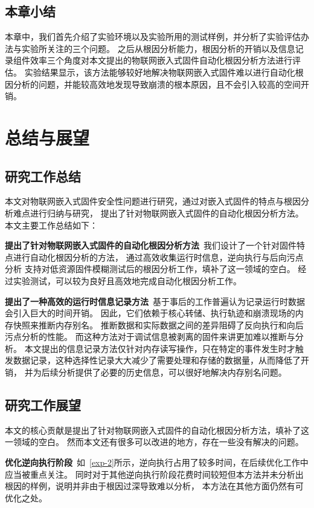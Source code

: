 \subsection{本章小结}
本章中，我们首先介绍了实验环境以及实验所用的测试样例，并分析了实验评估办法与实验所关注的三个问题。
之后从根因分析能力，根因分析的开销以及信息记录组件效率三个角度对本文提出的物联网嵌入式固件自动化根因分析方法进行评估。
实验结果显示，该方法能够较好地解决物联网嵌入式固件难以进行自动化根因分析的问题，并能较高效地发现导致崩溃的根本原因，且不会引入较高的空间开销。
\cleardoublepage
\section{总结与展望}        %
\subsection{研究工作总结}
本文对物联网嵌入式固件安全性问题进行研究，通过对嵌入式固件的特点与根因分析难点进行归纳与研究，
提出了针对物联网嵌入式固件的自动化根因分析方法。本文主要工作总结如下：

\textbf{提出了针对物联网嵌入式固件的自动化根因分析方法}\ 我们设计了一个针对固件特点进行自动化根因分析的方法，
通过高效收集运行时信息，逆向执行与后向污点分析
支持对低资源固件模糊测试后的根因分析工作，填补了这一领域的空白。
经过实验测试，可以较为良好且高效地完成自动化根因分析工作。

\textbf{提出了一种高效的运行时信息记录方法}\ 基于事后的工作普遍认为记录运行时数据会引入巨大的时间开销。
因此，它们依赖于核心转储、执行轨迹和崩溃现场的内存快照来推断内存别名。
推断数据和实际数据之间的差异阻碍了反向执行和向后污点分析的性能。
而这种方法对于调试信息被剥离的固件来讲更加难以推断与分析。
本文提出的信息记录方法仅针对内存读写操作，只在特定的事件发生时才触发数据记录，这种选择性记录大大减少了需要处理和存储的数据量，从而降低了开销，
并为后续分析提供了必要的历史信息，可以很好地解决内存别名问题。


\subsection{研究工作展望}
本文的核心贡献是提出了针对物联网嵌入式固件的自动化根因分析方法，填补了这一领域的空白。
然而本文还有很多可以改进的地方，存在一些没有解决的问题。


\textbf{优化逆向执行阶段}\ 如~\autoref{exp-2}所示，逆向执行占用了较多时间，在后续优化工作中应当被重点关注。
同时对于其他逆向执行阶段花费时间较短但本方法并未分析出根因的样例，说明并非由于根因过深导致难以分析，
本方法在其他方面仍然有可优化之处。

